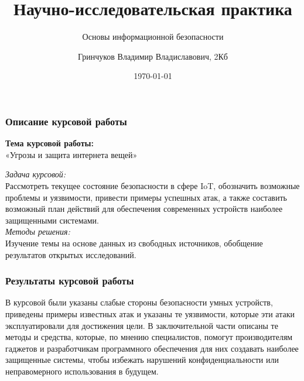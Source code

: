 \documentclass{beamer}
\title{Научно-исследовательская практика}
\subtitle{Основы информационной безопасности}
\author{Гринчуков Владимир Владиславович, 2Кб}
\institute{БФУ им. И. Канта}
\date{\today}
\begin{document}
\begin{frame}
    \titlepage
\end{frame}

\begin{frame}
\frametitle{Описание курсовой работы}
\begin{center}
    \textbf{Тема курсовой работы:}\\
    «Угрозы и защита интернета вещей»
\end{center}
\emph{Задача курсовой:}\\
Рассмотреть текущее состояние безопасности в сфере IoT, обозначить возможные проблемы и уязвимости, привести примеры успешных атак, а также составить возможный план действий для обеспечения современных устройств наиболее защищенными системами.\\
\emph{Методы решения:}\\
Изучение темы на основе данных из свободных источников, обобщение результатов открытых исследований.
\end{frame}
\begin{frame}
\frametitle{Результаты курсовой работы}
В курсовой были указаны слабые стороны безопасности умных устройств, приведены примеры известных атак и указаны те уязвимости, которые эти атаки эксплуатировали для достижения цели. В заключительной части описаны те методы и средства, которые, по мнению специалистов, помогут производителям гаджетов и разработчикам программного обеспечения для них создавать наиболее защищенные системы, чтобы избежать нарушений конфиденциальности или неправомерного использования в будущем.
\end{frame}
\end{document}
